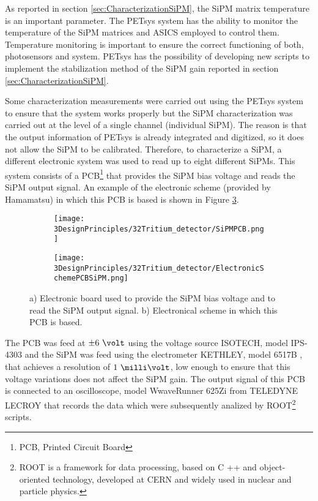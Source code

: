 As reported in section \ref{sec:CharacterizationSiPM}, the SiPM matrix temperature is an important parameter. The PETsys system has the ability to monitor the temperature of the SiPM matrices and ASICS employed to control them. Temperature monitoring is important to ensure the correct functioning of both, photosensors and system. PETsys has the possibility of developing new scripts to implement the stabilization method of the SiPM gain reported in section \ref{sec:CharacterizationSiPM}.

Some characterization measurements were carried out using the PETsys system to ensure that the system works properly but the SiPM characterization was carried out at the level of a single channel (individual SiPM). The reason is that the output information of PETsys is already integrated and digitized, so it does not allow the SiPM to be calibrated. Therefore, to characterize a SiPM, a different electronic system was used to read up to eight different SiPMs. This system consists of a PCB\footnote{PCB, Printed Circuit Board} that provides the SiPM bias voltage and reads the SiPM output signal. An example of the electronic scheme (provided by Hamamatsu) in which this PCB is based is shown in Figure \ref{fig:PCBSiPM}.

\begin{figure}
\centering
    \begin{subfigure}[b]{0.5\textwidth}
    \centering
    \texttt{[image: 3DesignPrinciples/32Tritium\_detector/SiPMPCB.png]}  
    \caption{\label{subfig:ElectronicBoardSiPM}}
    \end{subfigure}
    \hfill
    \begin{subfigure}[b]{0.45\textwidth}
    \centering
    \texttt{[image: 3DesignPrinciples/32Tritium\_detector/ElectronicSchemePCBSiPM.png]}  
    \caption{\label{subfig:ElectronicSchemePCBSiPM}}
    \end{subfigure}
    \hfill
 \caption{a) Electronic board used to provide the SiPM bias voltage and to read the SiPM output signal. b) Electronical scheme in which this PCB is based.}
 \label{fig:PCBSiPM}
\end{figure}
The PCB was feed at $\pm6~\volt$ using the voltage source ISOTECH, model IPS-4303 \cite{VoltageSourceISOTECH} and the SiPM was feed using the electrometer KETHLEY, model 6517B \cite{VoltageSourceKethley}, that achieves a resolution of $1~\milli\volt$, low enough to ensure that this voltage variations does not affect the SiPM gain. The output signal of this PCB is connected to an oscilloscope, model WwaveRunner 625Zi from TELEDYNE LECROY \cite{OscilloscopeIFIMED} that records the data which were subsequently analized by ROOT\footnote{ROOT is a framework for data processing, based on C ++ and object-oriented technology, developed at CERN and widely used in nuclear and particle physics.} scripts.